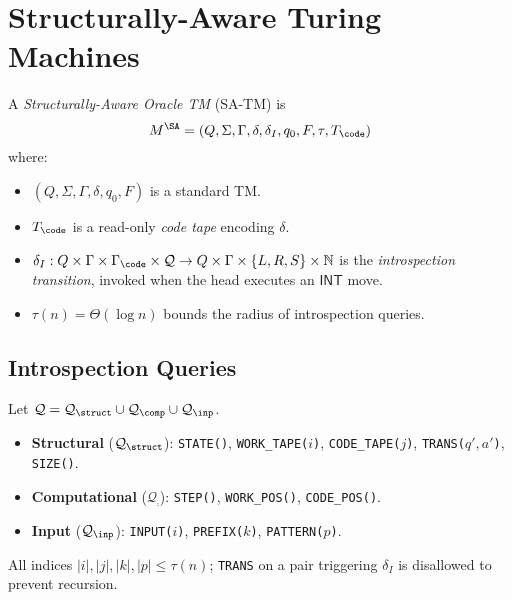 \documentclass[12pt]{article}
\begin{document}
\section{Structurally-Aware Turing Machines}
\begin{definition}[SA-TM]\label{def:satm}
A \emph{Structurally-Aware Oracle TM} (SA-TM) is 
\[
M^{\SA}=(Q,\Sigma,\Gamma,\delta,\delta_I,q_0,F,\tau,T_{\code})
\]
where:
\begin{itemize}
  \item $(Q,\Sigma,\Gamma,\delta,q_0,F)$ is a standard TM.
  \item $T_{\code}$ is a read-only \emph{code tape} encoding $\delta$.
  \item $\delta_I:Q\times\Gamma\times\Gamma_{\code}\times\mathcal{Q}\to Q\times\Gamma\times\{L,R,S\}\times\mathbb{N}$ is the \emph{introspection transition}, invoked when the head executes an $\mathsf{INT}$ move.
  \item $\tau(n)=\Theta(\log n)$ bounds the radius of introspection queries.
\end{itemize}
\end{definition}

\subsection{Introspection Queries}
\begin{definition}
Let $\mathcal{Q}=\mathcal{Q}_{\struct}\cup\mathcal{Q}_{\comp}\cup\mathcal{Q}_{\inp}$.
\begin{itemize}
  \item \textbf{Structural} (\(\mathcal{Q}_{\struct}\)): \texttt{STATE()}, \texttt{WORK\_TAPE($i$)}, \texttt{CODE\_TAPE($j$)}, \texttt{TRANS($q',a'$)}, \texttt{SIZE()}.
  \item \textbf{Computational} (\(\mathcal{Q}_{\comp}\)): \texttt{STEP()}, \texttt{WORK\_POS()}, \texttt{CODE\_POS()}.
  \item \textbf{Input} (\(\mathcal{Q}_{\inp}\)): \texttt{INPUT($i$)}, \texttt{PREFIX($k$)}, \texttt{PATTERN($p$)}.
\end{itemize}
All indices $|i|,|j|,|k|,|p|\le\tau(n)$; \texttt{TRANS} on a pair triggering $\delta_I$ is disallowed to prevent recursion.
\end{definition}
\end{document}
